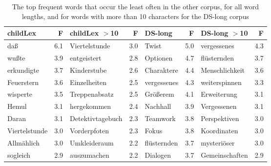 \documentclass[doc, a4paper, anonymous]{apa7}
\begin{document}
\begin{table}[!htbp]
\caption{The top frequent words that occur the least often in the other corpus, for all word lengths, and for words with more than 10 characters for the DS-long corpus}
\centering
\begin{tabular}{lrlrlrlr}
  \hline
childLex & F & childLex $>$10 & F & DS-long & F & DS-long $>$10 & F \\ 
  \hline
daß & 6.1 & Viertelstunde & 3.0 & Twist & 5.0 & vergessenes & 4.3 \\ 
  wußte & 3.9 & entgeistert & 2.8 & Optionen & 4.7 & flüsternden & 3.7 \\ 
  erkundigte & 3.7 & Kinderstube & 2.6 & Charaktere & 4.4 & Menschlichkeit & 3.6 \\ 
  Feuerstern & 3.6 & Einzelheiten & 2.5 & vergessenes & 4.3 & weiterspinnen & 3.3 \\ 
  wisperte & 3.5 & Treppenabsatz & 2.5 & Größerem & 4.1 & Erweiterung & 3.1 \\ 
  Hemul & 3.1 & hergekommen & 2.4 & Nachhall & 3.9 & Vergessenen & 3.1 \\ 
  Daran & 3.1 & Detektivtagebuch & 2.3 & Teamwork & 3.8 & Perspektiven & 3.0 \\ 
  Viertelstunde & 3.0 & Vorderpfoten & 2.3 & Fokus & 3.8 & Koordinaten & 3.0 \\ 
  Allmählich & 3.0 & Umkleideraum & 2.2 & flüsternden & 3.7 & mysteriöser & 3.0 \\ 
  sogleich & 2.9 & auszumachen & 2.2 & Dialogen & 3.7 & Gemeinschaften & 2.9 \\ 
   \hline
\end{tabular}
\label{words-dslo-low}
\end{table}
\end{document}
